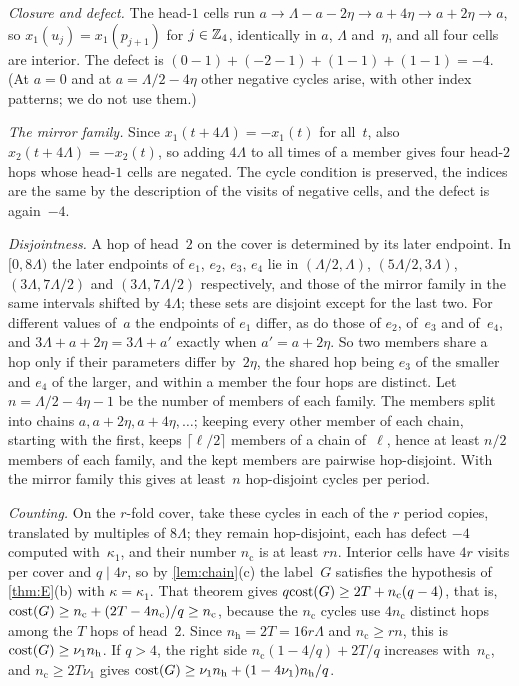 \begin{informalproof}
\emph{Closure and defect.} The head-$1$ cells run $a\to\Lambda-a-2\eta\to a+4\eta\to a+2\eta\to a$, so
$x_1(u_j)=x_1(p_{j+1})$ for $j\in\mathbb{Z}_4$, identically in $a$, $\Lambda$ and~$\eta$, and all four cells are interior. The
defect is $(0-1)+(-2-1)+(1-1)+(1-1)=-4$. (At $a=0$ and at $a=\Lambda/2-4\eta$ other negative cycles arise, with other
index patterns; we do not use them.)

\emph{The mirror family.} Since $x_1(t+4\Lambda)=-x_1(t)$ for all~$t$, also $x_2(t+4\Lambda)=-x_2(t)$, so adding
$4\Lambda$ to all times of a member gives four head-$2$ hops whose head-$1$ cells are negated. The cycle condition is
preserved, the indices are the same by the description of the visits of negative cells, and the defect is again~$-4$.

\emph{Disjointness.} A hop of head~$2$ on the cover is determined by its later endpoint. In $[0,8\Lambda)$ the later
endpoints of $e_1$, $e_2$, $e_3$, $e_4$ lie in $(\Lambda/2,\Lambda)$, $(5\Lambda/2,3\Lambda)$, $(3\Lambda,7\Lambda/2)$
and $(3\Lambda,7\Lambda/2)$ respectively, and those of the mirror family in the same intervals shifted by $4\Lambda$;
these sets are disjoint except for the last two. For different values of~$a$ the endpoints of $e_1$ differ, as do those
of $e_2$, of~$e_3$ and of~$e_4$, and $3\Lambda+a+2\eta=3\Lambda+a'$ exactly when $a'=a+2\eta$. So two members share a
hop only if their parameters differ by~$2\eta$, the shared hop being $e_3$ of the smaller and $e_4$ of the larger, and
within a member the four hops are distinct. Let $n=\Lambda/2-4\eta-1$ be the number of members of each family. The
members split into chains $a,a+2\eta,a+4\eta,\dots$; keeping every other member of each chain, starting with the
first, keeps $\lceil\ell/2\rceil$ members of a chain of~$\ell$, hence at least $n/2$ members of each family, and the
kept members are pairwise hop-disjoint. With the mirror family this gives at least~$n$ hop-disjoint cycles per period.

\emph{Counting.} On the $r$-fold cover, take these cycles in each of the $r$ period copies, translated by multiples of
$8\Lambda$; they remain hop-disjoint, each has defect $-4$ computed with~$\kappa_1$, and their number $n_{\mathrm c}$ is
at least $rn$. Interior cells have $4r$ visits per cover and $q\mid4r$, so by \cref{lem:chain}(c) the label~$G$
satisfies the hypothesis of \cref{thm:E}(b) with $\kappa=\kappa_1$. That theorem gives
$q\mathrm{cost}(G)\ge2T+n_{\mathrm c}(q-4)$, that is, $\mathrm{cost}(G)\ge n_{\mathrm c}+(2T-4n_{\mathrm c})/q\ge n_{\mathrm c}$,
because the $n_{\mathrm c}$ cycles use $4n_{\mathrm c}$ distinct hops among the $T$ hops of head~$2$. Since
$n_{\mathrm h}=2T=16r\Lambda$ and $n_{\mathrm c}\ge rn$, this is $\mathrm{cost}(G)\ge\nu_1n_{\mathrm h}$. If $q>4$, the right
side $n_{\mathrm c}(1-4/q)+2T/q$ increases with~$n_{\mathrm c}$, and $n_{\mathrm c}\ge2T\nu_1$ gives
$\mathrm{cost}(G)\ge\nu_1n_{\mathrm h}+(1-4\nu_1)n_{\mathrm h}/q$.


\end{informalproof}
